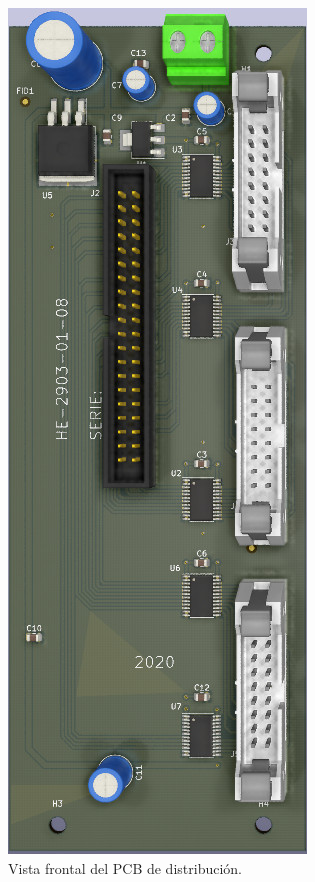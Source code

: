 \begin{figure}[htpb]
	\centering
    \includegraphics[scale=0.5]{Figures/renderpcbfrontaldistribuccion.jpg} 
	\caption{Vista frontal del PCB de distribución.}
	\label{fig:pcbrenderdistribuccionfrontal}
\end{figure}

